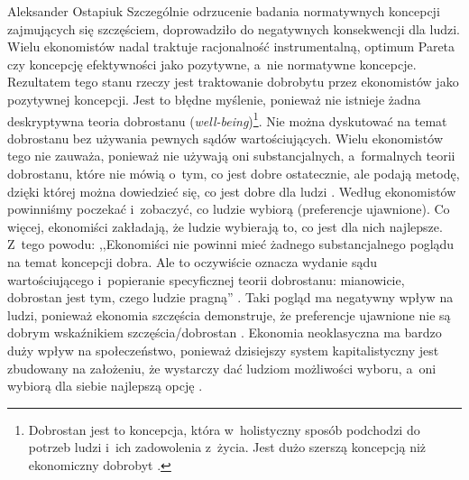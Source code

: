 \begin{artplenv}{Aleksander Ostapiuk}
Szczególnie odrzucenie badania normatywnych koncepcji zajmujących się szczęściem, doprowadziło do negatywnych
konsekwencji dla ludzi. Wielu ekonomistów nadal traktuje racjonalność instrumentalną, optimum Pareta czy koncepcję
efektywności jako pozytywne, a~nie normatywne koncepcje. Rezultatem tego stanu rzeczy jest traktowanie dobrobytu przez
ekonomistów jako pozytywnej koncepcji. Jest to błędne myślenie, ponieważ nie istnieje żadna deskryptywna teoria
dobrostanu (\textit{well-being})\footnote{Dobrostan jest to koncepcja, która w~holistyczny sposób podchodzi do potrzeb
ludzi i~ich zadowolenia z~życia. Jest dużo szerszą koncepcją niż ekonomiczny dobrobyt \parencite[por.][]{rybka_2019}.}.
Nie można dyskutować na temat
dobrostanu bez używania pewnych sądów wartościujących. Wielu ekonomistów tego nie zauważa, ponieważ nie używają oni
substancjalnych, a~formalnych teorii dobrostanu, które nie mówią o~tym, co jest dobre ostatecznie, ale podają metodę,
dzięki której można dowiedzieć się, co jest dobre dla ludzi
\parencite[s.~245]{hausman_etyka_2017_ost}.
Według ekonomistów powinniśmy poczekać i~zobaczyć, co ludzie wybiorą (preferencje ujawnione). Co więcej, ekonomiści
zakładają, że ludzie wybierają to, co jest dla nich najlepsze. Z~tego powodu: ,,Ekonomiści nie powinni mieć żadnego
substancjalnego poglądu na temat koncepcji dobra. Ale to oczywiście oznacza wydanie sądu wartościującego i~popieranie
specyficznej teorii dobrostanu: mianowicie, dobrostan jest tym, czego ludzie pragną''
\parencite[s.~214]{reiss_philosophy_2013}.
Taki pogląd ma negatywny wpływ na ludzi, ponieważ ekonomia szczęścia demonstruje, że preferencje
ujawnione nie są dobrym wskaźnikiem szczęścia/dobrostan
\parencites{bruni_economics_2005,bruni_handbook_2007}{bruni_capabilities_2008}%
{kahneman_well-being:_1999}{frey_what_2002}{frey_happiness_2010,frey_economics_2018}.
Ekonomia neoklasyczna ma bardzo duży wpływ na
społeczeństwo, ponieważ dzisiejszy system kapitalistyczny jest zbudowany na założeniu, że wystarczy dać ludziom
możliwości wyboru, a~oni wybiorą dla siebie najlepszą opcję
\parencite[zob.][]{friedman_free_1980}.


\end{artplenv}

